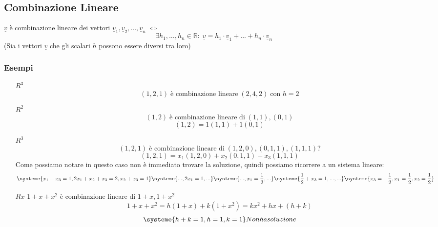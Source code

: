 \subsection{Combinazione Lineare}
$\underline{v}$ è combinazione lineare dei vettori $\underline{v}_1, \underline{v}_2,...,\underline{v}_n$ $\Leftrightarrow$
$$ \exists h_1,...,h_n \in \mathbb{R}: \; \underline{v} = h_1 \cdot \underline{v}_1 + ... + h_n \cdot \underline{v}_n $$ 
(Sia i vettori $\underline{v}$ che gli scalari $h$ possono essere diversi tra loro)

\subsubsection{Esempi}
\begin{itemize}
\item[$R^3$] $$ (1,2,1) \; \text{è combinazione lineare} \; (2,4,2) \; \text{con } h=2$$
\item[$R^2$] $$ (1,2) \; \text{è combinazione lineare di} \; (1,1), (0,1) $$ $$ (1,2)=1(1,1)+1(0,1) $$ 
\item[$R^3$] $$ (1,2,1) \; \text{è combinazione lineare di} \; (1,2,0),(0,1,1),(1,1,1) \text{?} $$
$$ (1,2,1) = x_1(1,2,0)+x_2(0,1,1)+x_3(1,1,1) $$
Come possiamo notare in questo caso non è immediato trovare la soluzione, quindi possiamo ricorrere a un sistema lineare:
$$ \systeme{x_1 + x_3 = 1, 2x_1 + x_2 + x_3 = 2, x_2 + x_3 = 1} \systeme{... , 2x_1 = 1, ...} \systeme{..., x_1 = \frac{1}{2}, ...} \systeme{\frac{1}{2}+x_3 = 1, ..., ...} \systeme{x_3 = -\frac{1}{2}, x_1 = \frac{1}{2}, x_2 = \frac{1}{2}} $$
\item[$Rx$] $1+x+x^2$ è combinazione lineare di $1+x, 1+x^2$
$$ 1+x+x^2 = h(1+x)+k(1+x^2) = kx^2+hx+(h+k) $$
$$ \systeme{h+k=1, h=1, k=1} Non ha soluzione $$
\end{itemize}

